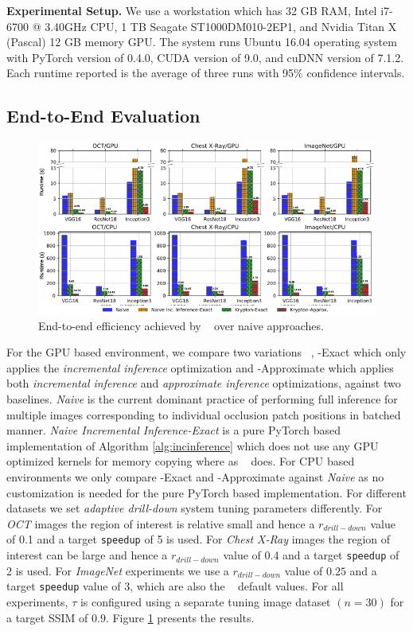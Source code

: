 \vspace{2mm}
\noindent \textbf{Experimental Setup.}
We use a workstation which has 32 GB RAM, Intel i7-6700 @ 3.40GHz CPU, 1 TB Seagate ST1000DM010-2EP1, and Nvidia Titan X (Pascal) 12 GB memory GPU.
The system runs Ubuntu 16.04 operating system with PyTorch version of 0.4.0, CUDA version of 9.0, and cuDNN version of 7.1.2.
Each runtime reported is the average of three runs with 95\% confidence intervals.

\subsection{End-to-End Evaluation}

\begin{figure}[t]
\includegraphics[width=\textwidth]{images/5_1_all_edited}
\caption{End-to-end efficiency achieved by \system~ over naive approaches.}
\label{fig:5_1_all_edited}
\end{figure}

For the GPU based environment, we compare two variations \system~, \system-Exact which only applies the \textit{incremental inference} optimization and \system-Approximate which applies both \textit{incremental inference} and \textit{approximate inference} optimizations, against two baselines.
\textit{Naive} is the current dominant practice of performing full inference for multiple images corresponding to individual occlusion patch positions in batched manner.
\textit{Naive Incremental Inference-Exact} is a pure PyTorch based implementation of Algorithm \ref{alg:incinference} which does not use any GPU optimized kernels for memory copying where as \system~ does.
For CPU based environments we only compare \system-Exact and \system-Approximate against \textit{Naive} as no customization is needed for the pure PyTorch based implementation.
For different datasets we set \textit{adaptive drill-down} system tuning parameters differently.
For \textit{OCT} images the region of interest is relative small and hence a $r_{drill-down}$ value of 0.1 and a target \texttt{speedup} of 5 is used.
For \textit{Chest X-Ray} images the region of interest can be large and hence a $r_{drill-down}$ value of 0.4 and a target \texttt{speedup} of 2 is used.
For \textit{ImageNet} experiments we use a $r_{drill-down}$ value of $0.25$ and a target \texttt{speedup} value of 3, which are also the \system~ default values.
For all experiments, $\tau$ is configured using a separate tuning image dataset $(n=30)$ for a target SSIM of $0.9$.
Figure \ref{fig:5_1_all_edited} presents the results.

